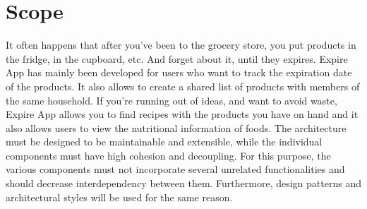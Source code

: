 \section{Scope}
It often happens that after you've been to the grocery store, you put products in the fridge, in the cupboard, etc. And forget about it, until they expires. Expire App has mainly been developed for users who want to track the expiration date of the products. It also allows to create a shared list of products with members of the same household. If you're running out of ideas, and want to avoid waste, Expire App allows you to find recipes with the products you have on hand and it also allows users to view the nutritional information of foods. The architecture must be designed to be maintainable and extensible, while the individual components must have high cohesion and decoupling. For this purpose, the various components must not incorporate several unrelated functionalities and should decrease interdependency between them. Furthermore, design patterns and architectural styles will be used for the same reason.

